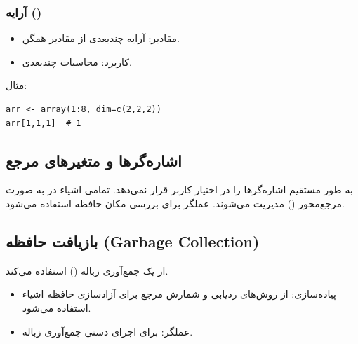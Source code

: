 \documentclass[11pt, a4paper, oneside]{book}
\begin{document}
				\subsubsection{آرایه ()}
				
					\begin{itemize}
						
						\item {\large مقادیر}:
						{\normalsize  آرایه چندبعدی از مقادیر همگن.}
						
						\item {\large کاربرد}:
						{\normalsize محاسبات چندبعدی.}
						
					\end{itemize}
					
					مثال:
					
					\begin{latin}
						\begin{lstlisting}[caption={\lr{Array data type}}] 
arr <- array(1:8, dim=c(2,2,2))
arr[1,1,1]  # 1

						\end{lstlisting}
					\end{latin}
				
			\subsection{اشاره‌گرها و متغیرهای مرجع}
				
				 به طور مستقیم اشاره‌گرها را در اختیار کاربر قرار نمی‌دهد.
				تمامی اشیاء در  به صورت مرجع‌محور () مدیریت می‌شوند.
				عملگر  برای بررسی مکان حافظه استفاده می‌شود.
		
			\subsection{بازیافت حافظه (Garbage Collection)}
			
				 از یک جمع‌آوری زباله () استفاده می‌کند.
				
				\begin{itemize}
					
					\item {\large پیاده‌سازی}:
					{\normalsize از روش‌های ردیابی و شمارش مرجع برای آزادسازی حافظه اشیاء استفاده می‌شود.}
					
					\item {\large عملگر}:
					{\normalsize {} برای اجرای دستی جمع‌آوری زباله.}
					
				\end{itemize}
		
\end{document}
